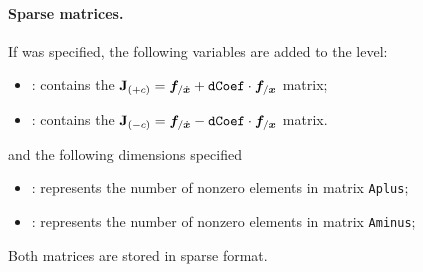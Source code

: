 \paragraph{Sparse matrices.}
If  was specified, the following variables are added to the
 level:
\begin{itemize}
\item {} : contains the 
    $\bm{\mathbf J}_{(+c)} = \boldsymbol{f}_{/\dot{\boldsymbol{x}}} + \texttt{dCoef} \cdot \boldsymbol{f}_{/\boldsymbol{x}}$ 
    matrix;
\item {} : contains the
    $\bm{\mathbf J}_{(-c)} = \boldsymbol{f}_{/\dot{\boldsymbol{x}}} - \texttt{dCoef} \cdot \boldsymbol{f}_{/\boldsymbol{x}}$ 
    matrix.
\end{itemize}
and the following dimensions specified
\begin{itemize}
\item {} : 
    represents the number of nonzero elements in matrix \texttt{Aplus};
\item {} : 
    represents the number of nonzero elements in matrix \texttt{Aminus};
\end{itemize}
Both matrices are stored in sparse format.

